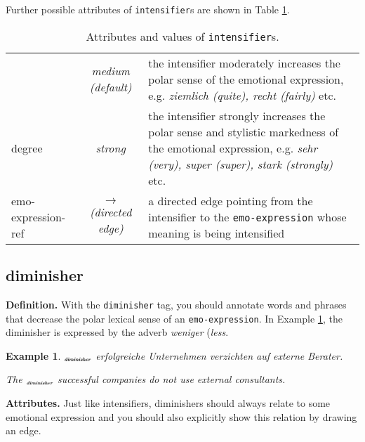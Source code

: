 \documentclass[11pt,a4paper]{article}
\newlength{\clmnwidth}
\theoremstyle{mytheoremstyle}
\newtheorem{exmp}{Example}[section]
\newcommand{\mtag}[2]{{\upshape[\emph{#2}\upshape]$_{\textrm{\bfseries\emph{\tiny
        #1}}}$}}
\newcommand{\diminisher}[2][]{\mtag{di\-mi\-ni\-sher\ifstrempty{#1}{}{:#1}}{#2}}
\begin{document}
Further possible attributes of \texttt{intensifier}s are shown in
Table \ref{tbl:intensifier}.
\begin{center}
  \begin{table}[htb]
    \caption{Attributes and values of \texttt{intensifier}s.}
    \begin{tabular}{|l|c|p{0.875\clmnwidth}|}\hline

      & \textit{medium (default)} & the intensifier moderately
      increases the polar sense of the emotional expression,
      e.g. \textit{ziemlich (quite), recht (fairly)} etc.\\\cline{2-3}

      \multirow{-2}{*}{degree} & \textit{strong} & the intensifier
      strongly increases the polar sense and stylistic markedness of the
      emotional expression, e.g. \textit{sehr (very), super (super),
        stark (strongly)} etc.\\\hline


      emo-expression-ref & \textit{$\longrightarrow$\newline(directed
        edge)} & a directed edge pointing from the intensifier to the
      \texttt{emo-expression} whose meaning is being intensified\\\hline
    \end{tabular}
    \label{tbl:intensifier}
  \end{table}
\end{center}

\subsection{diminisher}
\noindent\textbf{Definition.} With the \texttt{diminisher} tag, you
should annotate words and phrases that decrease the polar lexical
sense of an \texttt{emo-expression}.  In Example
\ref{exmp:diminisher}, the diminisher is expressed by the adverb
\textit{weniger} (\textit{less}.
\begin{exmp}
  \diminisher{Weniger} erfolgreiche Unternehmen verzichten auf externe
  Berater.\label{exmp:diminisher}

  The \diminisher{less} successful companies do not use external
  consultants.
\end{exmp}
\noindent\textbf{Attributes.} Just like intensifiers, diminishers
should always relate to some emotional expression and you should also
explicitly show this relation by drawing an edge.
\end{document}
